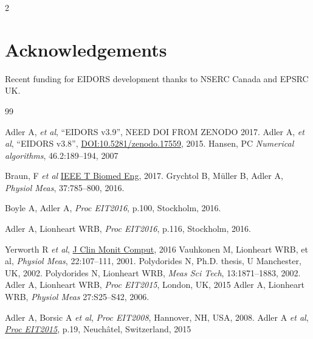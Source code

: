 \documentclass[10pt,letterpaper]{article}
\renewenvironment{thebibliography}[1]{%
    \begin{oldthebibliography}{#1}%
      \setlength{\parskip}{0ex}%
      \setlength{\itemsep}{0ex}%
  }%
  {%
    \end{oldthebibliography}%
  }
\begin{document}
\begin{multicols}{2}
\section*{Acknowledgements}
Recent funding for EIDORS development thanks to
NSERC Canada and EPSRC UK.

\footnotesize
\begin{thebibliography}{99}
   Adler A, {\em et al}, ``EIDORS v3.9'',
   NEED DOI FROM ZENODO
    2017.
   Adler A, {\em et al}, ``EIDORS v3.8'',
   \href{http://dx.doi.org/10.5281/zenodo.17559}{DOI:10.5281/zenodo.17559},
    2015.
   Hansen, PC {\em Numerical algorithms}, 46.2:189--194, 2007

   Braun, F {\em et al} \href{http://dx.doi.org/10.1109/TBME.2017.2659540}{IEEE T Biomed Eng}, 2017.
   Grychtol B, Müller B, Adler A,
   {\em Physiol Meas}, 37:785--800, 2016.

Boyle A, Adler A,
{\em Proc EIT2016}, p.100, Stockholm,  2016.

Adler A, Lionheart WRB, 
{\em Proc EIT2016}, p.116, Stockholm,  2016.

Yerworth R {\em et al}, \href{http://dx.doi.org/10.1007/s10877-016-9920-y}{J Clin Monit Comput}, 2016
   Vauhkonen M, Lionheart WRB,  et al,
   {\em  Physiol Meas}, 22:107--111, 2001.
   Polydorides N,
 Ph.D. thesis, U Manchester, UK, 2002.
   Polydorides N, Lionheart WRB,
   {\em Meas Sci Tech}, 13:1871--1883, 2002.
Adler A, Lionheart WRB,
{\em Proc EIT2015}, London, UK, 2015
%
Adler A, Lionheart WRB,
{\em Physiol Meas} 27:S25--S42, 2006.

Adler A, Borsic A {\em et al},
{\em Proc EIT2008}, Hannover, NH, USA, 2008.
Adler A {\em et al}, %
\href{https://zenodo.org/record/17752}{\em Proc EIT2015}, p.19, 
 Neuchâtel, Switzerland, 2015
\end{thebibliography}
\end{multicols}
\end{document}
